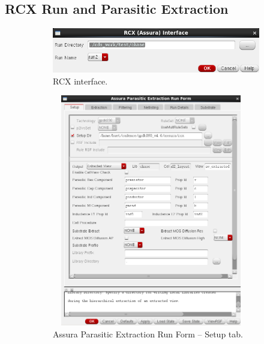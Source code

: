 \documentclass[11pt]{article}
\begin{document}
\subsection{RCX Run and Parasitic Extraction}
\begin{figure}[!h]
    \begin{subfigure}[h]{\textwidth}
        \begin{center}
            \includegraphics[scale=0.5]{rcxInterface}
            \caption{RCX interface.}
        \end{center}
    \end{subfigure}
    \begin{subfigure}[h]{0.5\textwidth}
        \begin{center}
            \includegraphics[width=0.95\textwidth,height=4in]{rcxSetup}
            \caption{Assura Parasitic Extraction Run Form -- Setup tab.}
        \end{center}
    \end{subfigure}
    \begin{subfigure}[h]{0.5\textwidth}
        \begin{center}

\end{center}
\end{subfigure}
\end{figure}
\end{document}
